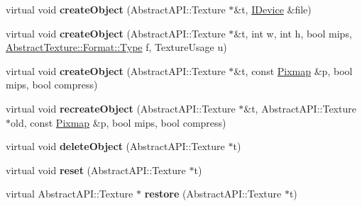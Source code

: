 \begin{DoxyCompactItemize}
\item 
\hypertarget{class_tempest_1_1_texture_holder_aec0c6b4bc1a3dbb566f13d55d80e8dd1}{virtual void {\bfseries create\+Object} (Abstract\+A\+P\+I\+::\+Texture $\ast$\&t, \hyperlink{class_tempest_1_1_i_device}{I\+Device} \&file)}\label{class_tempest_1_1_texture_holder_aec0c6b4bc1a3dbb566f13d55d80e8dd1}

\item 
\hypertarget{class_tempest_1_1_texture_holder_a2feee80eb2f42a920673e2ee44128520}{virtual void {\bfseries create\+Object} (Abstract\+A\+P\+I\+::\+Texture $\ast$\&t, int w, int h, bool mips, \hyperlink{struct_tempest_1_1_abstract_texture_1_1_format_a231a1f516e53783bf72c713669b115b3}{Abstract\+Texture\+::\+Format\+::\+Type} f, Texture\+Usage u)}\label{class_tempest_1_1_texture_holder_a2feee80eb2f42a920673e2ee44128520}

\item 
\hypertarget{class_tempest_1_1_texture_holder_ad9abeddf9a3403b924831cad52cd6fd3}{virtual void {\bfseries create\+Object} (Abstract\+A\+P\+I\+::\+Texture $\ast$\&t, const \hyperlink{class_tempest_1_1_pixmap}{Pixmap} \&p, bool mips, bool compress)}\label{class_tempest_1_1_texture_holder_ad9abeddf9a3403b924831cad52cd6fd3}

\item 
\hypertarget{class_tempest_1_1_texture_holder_abff10719437ef2532a6379132327afd9}{virtual void {\bfseries recreate\+Object} (Abstract\+A\+P\+I\+::\+Texture $\ast$\&t, Abstract\+A\+P\+I\+::\+Texture $\ast$old, const \hyperlink{class_tempest_1_1_pixmap}{Pixmap} \&p, bool mips, bool compress)}\label{class_tempest_1_1_texture_holder_abff10719437ef2532a6379132327afd9}

\item 
\hypertarget{class_tempest_1_1_texture_holder_ab5fa16291ea87784cb7f016b54979655}{virtual void {\bfseries delete\+Object} (Abstract\+A\+P\+I\+::\+Texture $\ast$t)}\label{class_tempest_1_1_texture_holder_ab5fa16291ea87784cb7f016b54979655}

\item 
\hypertarget{class_tempest_1_1_texture_holder_a39cc9862cf6642be9b33d9fff6f14338}{virtual void {\bfseries reset} (Abstract\+A\+P\+I\+::\+Texture $\ast$t)}\label{class_tempest_1_1_texture_holder_a39cc9862cf6642be9b33d9fff6f14338}

\item 
\hypertarget{class_tempest_1_1_texture_holder_a3a4eae4fc11438bc68ebf0034c3ff10a}{virtual Abstract\+A\+P\+I\+::\+Texture $\ast$ {\bfseries restore} (Abstract\+A\+P\+I\+::\+Texture $\ast$t)}\label{class_tempest_1_1_texture_holder_a3a4eae4fc11438bc68ebf0034c3ff10a}


\end{DoxyCompactItemize}
